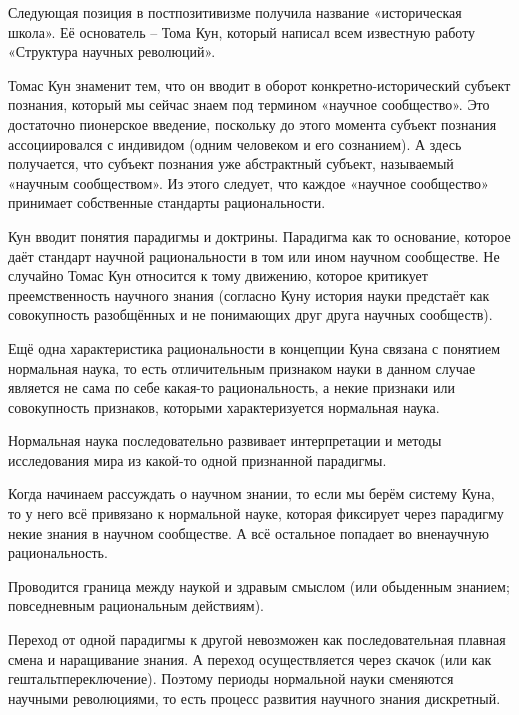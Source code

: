 \documentclass[exam_answers.tex]{subfiles}
\begin{document}
\renewcommand{\baselinestretch}{\blch}

Следующая позиция в постпозитивизме получила название «историческая школа». Её основатель – Тома Кун, который написал всем известную работу «Структура научных революций».

Томас Кун знаменит тем, что он вводит в оборот конкретно-исторический субъект познания, который мы сейчас знаем под термином «научное сообщество».
Это достаточно пионерское введение, поскольку до этого момента субъект познания ассоциировался с индивидом (одним человеком и его сознанием).
А здесь получается, что субъект познания уже абстрактный субъект, называемый «научным сообществом».
Из этого следует, что каждое «научное сообщество» принимает собственные стандарты рациональности.

Кун вводит понятия парадигмы и доктрины.
Парадигма как то основание, которое даёт стандарт научной рациональности в том или ином научном сообществе.
Не случайно Томас Кун относится к тому движению, которое критикует преемственность научного знания (согласно Куну история науки предстаёт как совокупность разобщённых и не понимающих друг друга научных сообществ).

Ещё одна характеристика рациональности в концепции Куна связана с понятием нормальная наука, то есть отличительным признаком науки в данном случае является не сама по себе какая-то рациональность, а некие признаки или совокупность признаков, которыми характеризуется нормальная наука.

Нормальная наука последовательно развивает интерпретации и методы исследования мира из какой-то одной признанной парадигмы.

Когда начинаем рассуждать о научном знании, то если мы берём систему Куна, то у него всё привязано к нормальной науке, которая фиксирует через парадигму некие знания в научном сообществе.
А всё остальное попадает во вненаучную рациональность.

 Проводится граница между наукой и здравым смыслом (или обыденным знанием; повседневным рациональным действиям).
 
Переход от одной парадигмы к другой невозможен как последовательная плавная смена и наращивание знания.
А переход осуществляется через скачок (или как гештальтпереключение).
Поэтому периоды нормальной науки сменяются научными революциями, то есть процесс развития научного знания дискретный.
\\
\end{document}
